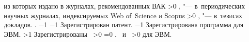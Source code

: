 {\begin{refsection}
{             из которых издано в журналах, рекомендованных ВАК}%
        \ifnum \value{citeauthorscopuswos}>0%
            ,  "--- в~периодических научных журналах, индексируемых Web of~Science и Scopus%
        \fi%
        \ifnum \value{citeauthorconf}>0%
            ,  "--- в~тезисах докладов.
        \else%
            .
        \fi%
        \ifnum \value{citeregistered}=1%
            \ifnum \value{citeauthorpatent}=1%
                Зарегистрирован  патент.
            \fi%
            \ifnum \value{citeauthorprogram}=1%
                Зарегистрирована  программа для ЭВМ.
            \fi%
        \fi%
        \ifnum \value{citeregistered}>1%
            Зарегистрированы\ %
            \ifnum \value{citeauthorpatent}>0%
                \ifnum \value{citeauthorprogram}=0 . \else \ и~\fi%
            \fi%
            \ifnum \value{citeauthorprogram}>0%
                 для ЭВМ.
            \fi%
        \fi%
    \end{refsection}%
    \begin{refsection}
    \end{refsection}%
}


